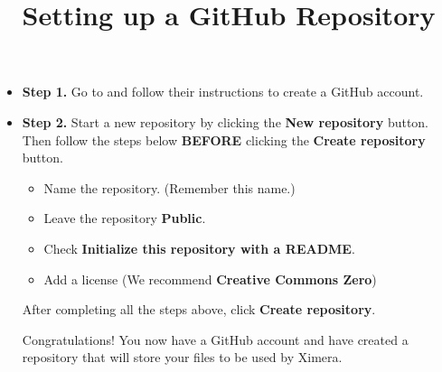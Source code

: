 \documentclass{ximera}
\title{Setting up a GitHub Repository}
\begin{document}

\maketitle


\begin{itemize}

\item\textbf{Step 1.} Go to  and follow their instructions to create a GitHub account. 

\item\textbf{Step 2.} Start a new repository by clicking the \textbf{New repository} button. 
Then follow the steps below \textbf{BEFORE} clicking the \textbf{Create repository} button.

\begin{itemize}

\item Name the repository. (Remember this name.)
\item Leave the repository \textbf{Public}.
\item Check \textbf{Initialize this repository with a README}.
\item Add a license (We recommend \textbf{Creative Commons Zero})

\end{itemize}

After completing all the steps above, click \textbf{Create repository}.

Congratulations! You now have a GitHub account and have created a repository that will store your files to be used by Ximera.

\end{itemize}
\end{document}
